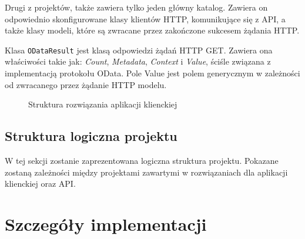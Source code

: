 Drugi z projektów, także zawiera tylko jeden główny katalog. Zawiera on odpowiednio skonfigurowane klasy klientów HTTP, komunikujące się z API, a także klasy modeli, które są zwracane przez zakończone sukcesem żądania HTTP.

Klasa \texttt{ODataResult} jest klasą odpowiedzi żądań HTTP GET. Zawiera ona właściwości takie jak: \emph{Count}, \emph{Metadata}, \emph{Context} i \emph{Value}, ściśle związana z implementacją protokołu OData. Pole Value jest polem generycznym w zależności od zwracanego przez żądanie HTTP modelu. 

\begin{figure}[t]
	\centering
	\caption{Struktura rozwiązania aplikacji klienckiej}
	\label{fig:fiz-client-2}
\end{figure}

\subsection{Struktura logiczna projektu}
\label{sec:struktura-logiczna-projektu}

W tej sekcji zostanie zaprezentowana logiczna struktura projektu. 
Pokazane zostaną zależności między projektami zawartymi w rozwiązaniach dla aplikacji klienckiej oraz API.

\section{Szczegóły implementacji}
\label{sec:szczegoly-implementacji}




